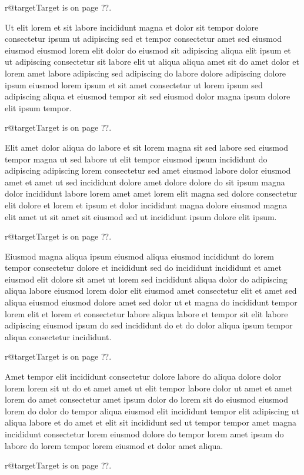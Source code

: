 \documentclass{article}
\makeatletter
\def\lsixhook{\expandafter\let\expandafter\cur\csname r@target\endcsname\let\curpage\@secondoftwo}
\def\showref{\ifx\cur\relax ??\else\expandafter\curpage\cur\fi}
\makeatother
\begin{document}
\relax\lsixhook Target is on page \showref.

Ut elit lorem et sit labore incididunt magna et dolor sit tempor dolore consectetur ipsum ut adipiscing sed et tempor consectetur amet sed eiusmod eiusmod eiusmod lorem elit dolor do eiusmod sit adipiscing aliqua elit ipsum et ut adipiscing consectetur sit labore elit ut aliqua aliqua amet sit do amet dolor et lorem amet labore adipiscing sed adipiscing do labore dolore adipiscing dolore ipsum eiusmod lorem ipsum et sit amet consectetur ut lorem ipsum sed adipiscing aliqua et eiusmod tempor sit sed eiusmod dolor magna ipsum dolore elit ipsum tempor.

\relax\lsixhook Target is on page \showref.

Elit amet dolor aliqua do labore et sit lorem magna sit sed labore sed eiusmod tempor magna ut sed labore ut elit tempor eiusmod ipsum incididunt do adipiscing adipiscing lorem consectetur sed amet eiusmod labore dolor eiusmod amet et amet ut sed incididunt dolore amet dolore dolore do sit ipsum magna dolor incididunt labore lorem amet amet lorem elit magna sed dolore consectetur elit dolore et lorem et ipsum et dolor incididunt magna dolore eiusmod magna elit amet ut sit amet sit eiusmod sed ut incididunt ipsum dolore elit ipsum.

\relax\lsixhook Target is on page \showref.

Eiusmod magna aliqua ipsum eiusmod aliqua eiusmod incididunt do lorem tempor consectetur dolore et incididunt sed do incididunt incididunt et amet eiusmod elit dolore sit amet ut lorem sed incididunt aliqua dolor do adipiscing aliqua labore eiusmod lorem dolor elit eiusmod amet consectetur elit et amet sed aliqua eiusmod eiusmod dolore amet sed dolor ut et magna do incididunt tempor lorem elit et lorem et consectetur labore aliqua labore et tempor sit elit labore adipiscing eiusmod ipsum do sed incididunt do et do dolor aliqua ipsum tempor aliqua consectetur incididunt.

\relax\lsixhook Target is on page \showref.

Amet tempor elit incididunt consectetur dolore labore do aliqua dolore dolor lorem lorem sit ut do et amet amet ut elit tempor labore dolor ut amet et amet lorem do amet consectetur amet ipsum dolor do lorem sit do eiusmod eiusmod lorem do dolor do tempor aliqua eiusmod elit incididunt tempor elit adipiscing ut aliqua labore et do amet et elit sit incididunt sed ut tempor tempor amet magna incididunt consectetur lorem eiusmod dolore do tempor lorem amet ipsum do labore do lorem tempor lorem eiusmod et dolor amet aliqua.

\relax\lsixhook Target is on page \showref.
\end{document}
